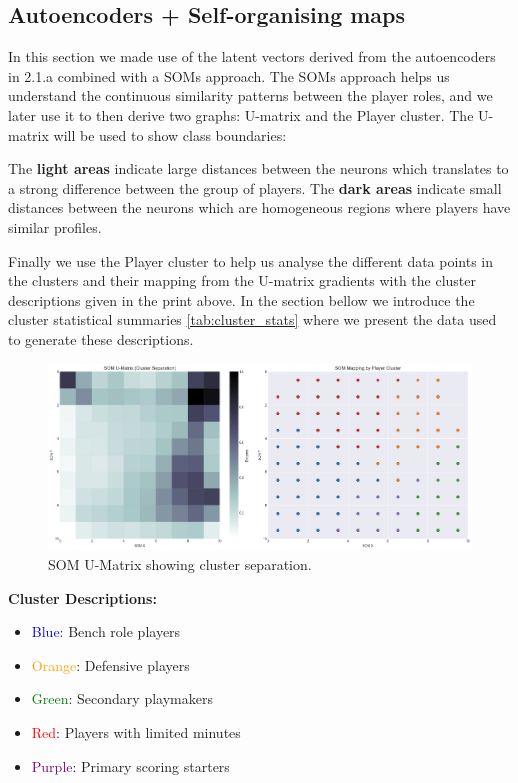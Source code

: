 \documentclass{article}
\begin{document}
\subsection{Autoencoders + Self-organising maps}

In this section we made use of the latent vectors derived from the autoencoders in 2.1.a combined with a SOMs approach.
The SOMs approach helps us understand the continuous similarity patterns between the player roles, and we later use it to then derive two graphs: U-matrix and the Player cluster. The U-matrix will be used to show class boundaries:

The {\bf light areas} indicate large distances between the neurons which translates to a strong difference between the group of players.
The {\bf dark areas} indicate small distances between the neurons which are homogeneous regions where players have similar profiles.

Finally we use the Player cluster to help us analyse the different data points in the clusters and their mapping from the U-matrix gradients with the cluster descriptions given in the print above. In the section bellow we introduce the cluster statistical summaries \ref{tab:cluster_stats} where we present the data used to generate these descriptions.

\begin{figure}[h]
    \centering
    \includegraphics[width=0.7\linewidth]{media/2b.png}
    \caption{SOM U-Matrix showing cluster separation.}
\end{figure}

{\bf Cluster Descriptions:}
\begin{itemize}
    \item \textcolor{blue}{Blue}: Bench role players
    \item \textcolor{orange}{Orange}: Defensive players
    \item \textcolor{green}{Green}: Secondary playmakers
    \item \textcolor{red}{Red}: Players with limited minutes
    \item \textcolor{purple}{Purple}: Primary scoring starters
\end{itemize}
\end{document}
